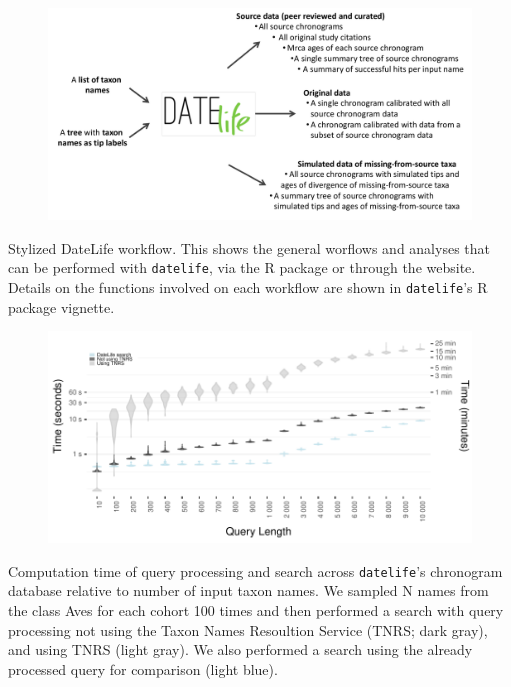\documentclass[]{article}
\begin{document}
\newpage
\begin{figure}[!h]
\includegraphics{./figures/Fig1.pdf}
\caption{}
\label{fig:workflow}
\end{figure}
Stylized DateLife workflow. This shows the general worflows and analyses that can be performed with \texttt{datelife}, via the R package or through the website. Details on the functions involved on each workflow are shown in \texttt{datelife}'s R package vignette.
\newpage
\begin{figure}[!h]
\includegraphics[width=1\linewidth]{./figures/fig_runtime_main.pdf}
\caption{}
\label{fig:runtime1}
\end{figure}
Computation time of query processing and search across \texttt{datelife}'s chronogram database relative to number of input taxon names. We sampled N names from the class Aves for each cohort 100 times and then performed a search with query processing not using the Taxon Names Resoultion Service (TNRS; dark gray), and using TNRS (light gray). We also performed a search using the already processed query for comparison (light blue).
\end{document}
